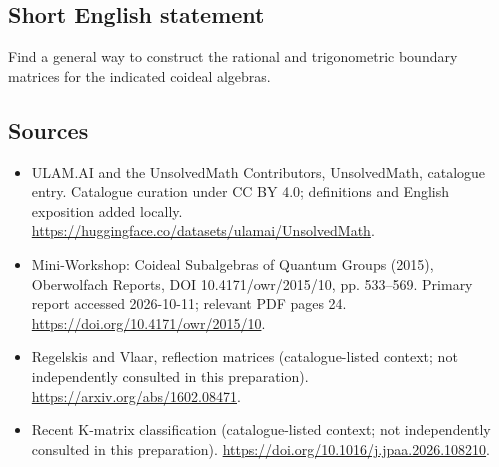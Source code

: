 \documentclass[11pt]{article}
\begin{document}
\subsection{Short English statement}
Find a general way to construct the rational and trigonometric boundary matrices for the indicated coideal algebras.
\subsection{Sources}
\begin{itemize}
\item[\hypertarget{source:statement:1}{S1}] ULAM.AI and the UnsolvedMath Contributors, UnsolvedMath, catalogue entry. Catalogue curation under CC BY 4.0; definitions and English exposition added locally.
\url{https://huggingface.co/datasets/ulamai/UnsolvedMath}.
\item[\hypertarget{source:statement:2}{S2}] Mini-Workshop: Coideal Subalgebras of Quantum Groups (2015), Oberwolfach Reports, DOI 10.4171/owr/2015/10, pp. 533--569. Primary report accessed 2026-10-11; relevant PDF pages 24.
\url{https://doi.org/10.4171/owr/2015/10}.
\item[\hypertarget{source:statement:3}{S3}] Regelskis and Vlaar, reflection matrices (catalogue-listed context; not independently consulted in this preparation).
\url{https://arxiv.org/abs/1602.08471}.
\item[\hypertarget{source:statement:4}{S4}] Recent K-matrix classification (catalogue-listed context; not independently consulted in this preparation).
\url{https://doi.org/10.1016/j.jpaa.2026.108210}.
\end{itemize}
\label{end:statement}
\end{document}
